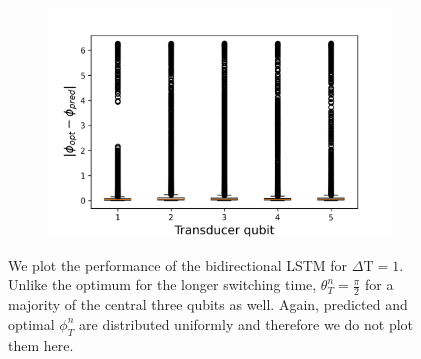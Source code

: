 \begin{figure}[h]
\begin{subfigure}{0.45\textwidth}
	\end{subfigure}
	\begin{subfigure}{0.45\textwidth}
		\centering
		\includegraphics[width=\textwidth]{img/delta_phi_box_dt_12}
	\end{subfigure}
	\caption{We plot the performance of the bidirectional LSTM for $\Delta \mathrm{T} = 1$. Unlike the optimum for the longer switching time, $\theta_T^n = \frac{\pi}{2}$ for a majority of the central three qubits as well. Again, predicted and optimal $\phi^n_T$ are distributed uniformly and therefore we do not plot them here.}
	\label{dt1box}
\end{figure}

\newpage